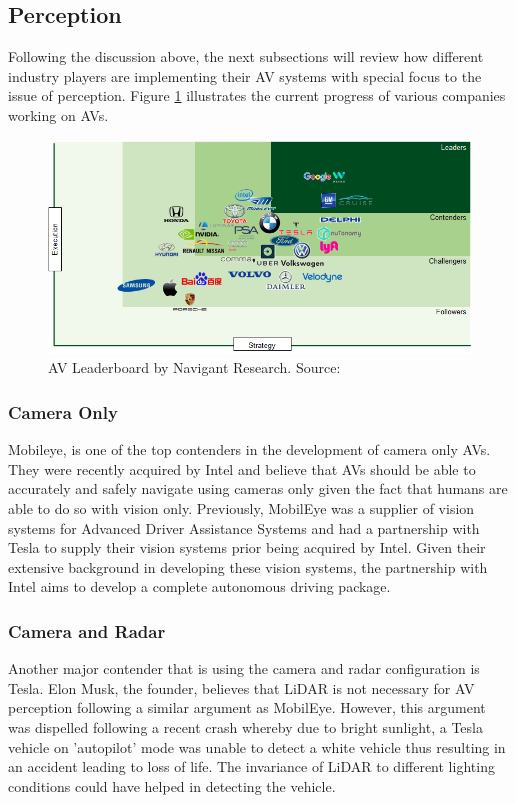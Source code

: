 \subsection{Perception}
Following the discussion above, the next subsections will review how different industry players are implementing their AV systems with special focus to the issue of perception. Figure \ref{fig:players} illustrates the current progress of various companies working on AVs.
\begin{figure}
	\includegraphics[width=\textwidth]{media/avind.png}
	\caption{AV Leaderboard by Navigant Research. Source:\cite{navigantresearch_2018}}
	\label{fig:players}
\end{figure}
\subsubsection*{Camera Only}
Mobileye\cite{mobileye_2018}, is one of the top contenders in the development of camera only AVs. They were recently acquired by Intel and believe that AVs should be able to accurately and safely navigate using cameras only given the fact that humans are able to do so with vision only. Previously, MobilEye was a supplier of vision systems for Advanced Driver Assistance Systems and had a partnership with Tesla to supply their vision systems prior being acquired by Intel. 
Given their extensive background in developing these vision systems, the partnership with Intel aims to develop a complete autonomous driving package\cite{intelsolutions_2018}.
 

\subsubsection*{Camera and  Radar}
Another major contender that is using the camera and radar configuration is Tesla. Elon Musk, the founder, believes that LiDAR is not necessary for AV perception following a similar argument as MobilEye. However, this argument was dispelled following a recent crash whereby due to bright sunlight, a Tesla vehicle on 'autopilot' mode was unable to detect a white vehicle thus resulting in an accident leading to loss of life. The invariance of LiDAR to different lighting conditions could have helped in detecting the vehicle. 


